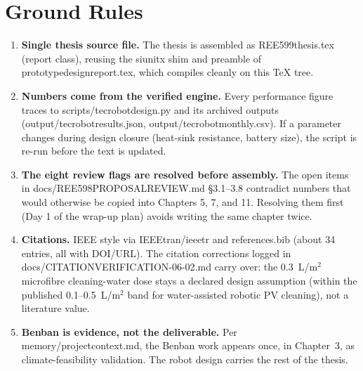 \documentclass[11pt,a4paper]{article}
\newcommand{\f}[1]{{\ttfamily\def\_{\textunderscore\allowbreak}#1}}
\begin{document}
\section{Ground Rules}
\begin{enumerate}[leftmargin=*]
  \item \textbf{Single thesis source file.} The thesis is assembled as
        \f{REE599\_thesis.tex} (\f{report} class), reusing the siunitx shim and
        preamble of \f{prototype\_design\_report.tex}, which compiles cleanly on
        this TeX tree.
  \item \textbf{Numbers come from the verified engine.} Every performance figure
        traces to \f{scripts/tec\_robot\_design.py} and its archived outputs
        (\f{output/tec\_robot\_results.json}, \f{output/tec\_robot\_monthly.csv}).
        If a parameter changes during design closure (heat-sink resistance,
        battery size), the script is re-run before the text is updated.
  \item \textbf{The eight review flags are resolved before assembly.} The open
        items in \f{docs/REE598\_PROPOSAL\_REVIEW.md} \S3.1--3.8 contradict
        numbers that would otherwise be copied into Chapters 5, 7, and 11.
        Resolving them first (Day 1 of the wrap-up plan) avoids writing the same
        chapter twice.
  \item \textbf{Citations.} IEEE style via \f{IEEEtran}/\f{ieeetr} and
        \f{references.bib} (about 34 entries, all with DOI/URL). The citation
        corrections logged in \f{docs/CITATION\_VERIFICATION\_2026-06-02.md}
        carry over: the 0.3~L/m$^2$ microfibre cleaning-water dose stays a
        declared design assumption (within the published 0.1--0.5~L/m$^2$ band
        for water-assisted robotic PV cleaning), not a literature value.
  \item \textbf{Benban is evidence, not the deliverable.} Per
        \f{memory/project\_context.md}, the Benban work appears once, in
        Chapter~3, as climate-feasibility validation. The robot design carries
        the rest of the thesis.
\end{enumerate}

\end{document}

